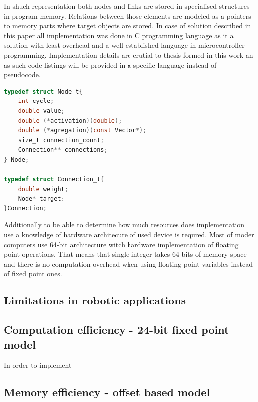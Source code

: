 In shuch representation both nodes and links are stored in specialised structures in program
memory. Relations between those elements are modeled as a pointers to memory parts where target
objects are stored.
In case of solution described in this paper all implementation was done in C programming language
as it a solution with least overhead and a well established language in microcontroller
programming. 
Implementation details are crutial to thesis formed in this work an as such code listings will be
provided in a specific language instead of pseudocode.
\begin{lstlisting}[frame=single, language=C, caption={Implementation of Node and Link structures in C}]
typedef struct Node_t{
	int cycle;
	double value;
	double (*activation)(double);
	double (*agregation)(const Vector*);
	size_t connection_count;
	Connection** connections;
} Node;

typedef struct Connection_t{
	double weight;
	Node* target;
}Connection;
\end{lstlisting}
Additionally to be able to determine how much resources does implementation use a knowledge of 
hardware architecure of used device is requred.
Most of moder computers use 64-bit architecture witch hardware implementation of floating point
operations. That means that single integer takes 64 bits of memory space and there is no 
computation overhead when using floating point variables instead of fixed point ones.

\FloatBarrier
\subsection{Limitations in robotic applications}

\FloatBarrier
\subsection{Computation efficiency - 24-bit fixed point model}
\label{sec:fixed-model}
In order to implement 

\FloatBarrier
\subsection{Memory efficiency - offset based model}
